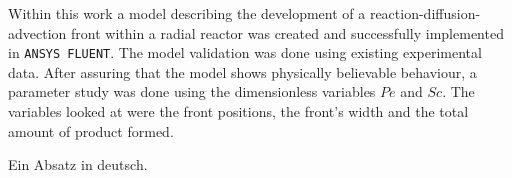 \documentclass[../thesis.tex]{subfiles}
\begin{document}
\label{chp:abstract}

Within this work a model describing the development of a reaction-diffusion-advection front within a radial reactor was created and successfully implemented in \texttt{ANSYS FLUENT}. The model validation was done using existing experimental data. After assuring that the model shows physically believable behaviour, a parameter study was done using the dimensionless variables $Pe$ and $Sc$. The variables looked at were the front positions, the front's width and the total amount of product formed.
\newline

Ein Absatz in deutsch.
\end{document}
